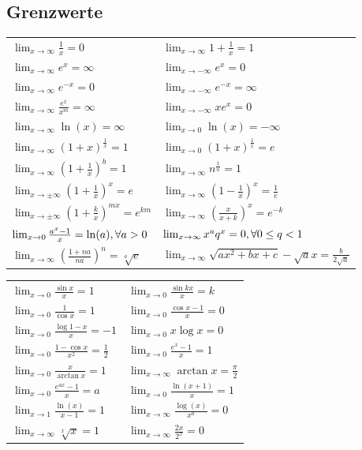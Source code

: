 \documentclass[7pt,landscape, margin = 0.1mm]{article}
\def\limxo{\lim_{x\to 0}}
\def\limxi{\lim_{x\to\infty}}
\def\limxn{\lim_{x\to-\infty}}
\begin{document}
\begin{multicols}{4}
\begin{flushleft}
\subsection{Grenzwerte}
\begin{center}
  \begin{tabularx}{\linewidth}{XX}
    \toprule
    $\limxi \frac{1}{x} = 0$ & $\limxi 1 + \frac{1}{x} = 1$ \\
    $\limxi e^x = \infty$ & $\limxn e^x = 0$ \\
    $\limxi e^{-x} = 0$ & $\limxn e^{-x} = \infty$ \\
    $\limxi \frac{e^x}{x^m} = \infty$ & $\limxn xe^x = 0$ \\
    $\limxi \ln(x) = \infty$ & $\limxo \ln(x) = -\infty$ \\
    $\limxi (1+x)^{\frac{1}{x}} = 1$ & $\limxo (1+x)^{\frac{1}{x}} = e$ \\
    $\limxi (1+\frac{1}{x})^b = 1$ & $\limxi n^{\frac{1}{n}} = 1$ \\
    $\lim_{x\to\pm\infty} (1 + \frac{1}{x})^x = e$ & $\limxi (1-\frac{1}{x})^x = \frac{1}{e}$ \\
    $\lim_{x\to\pm\infty} (1 + \frac{k}{x})^{mx} = e^{km}$ & $\limxi (\frac{x}{x+k})^x = e^{-k}$ \\
    $\limxo \frac{a^x -1}{x} = \ln(a), \newline \forall a > 0$ &
    $\limxi x^a q^x = 0, \newline \forall 0 \le q < 1$ \\
    $\lim_{x \to \infty} \left(\frac{1+ na}{na} \right)^n = \sqrt[a]{e}$ & $\lim_{x \to \infty} \sqrt{ax^2 + bx+c}- \sqrt{a}x = \frac{b}{2 \sqrt{a}}$\\
  \end{tabularx}
  \begin{tabularx}{\linewidth}{XX}
    $\limxo \frac{\sin x}{x} = 1$ & $\limxo \frac{\sin kx}{x} = k$\\
    $\limxo \frac{1}{\cos x} = 1$ & $\limxo \frac{\cos x -1}{x} = 0$ \\
    $\limxo \frac{\log 1 - x}{x} = -1$ & $\limxo x \log x = 0$\\
    $\limxo \frac{1 - \cos x}{x^2} = \frac{1}{2}$ & $\limxo \frac{e^x-1}{x} = 1$ \\
    $\limxo \frac{x}{\arctan x} = 1$ & $\limxi \arctan x = \frac{\pi}{2}$ \\
    $\limxo \frac{e^{ax}-1}{x} = a$ & $\limxo \frac{\ln(x+1)}{x} = 1$ \\
    $\lim_{x\to 1} \frac{\ln(x)}{x-1} = 1$ & $\limxi \frac{\log(x)}{x^a} = 0$ \\
    $\limxi \sqrt[x]{x} = 1$ & $\limxi \frac{2x}{2^x} = 0$ \\
    \bottomrule
  \end{tabularx}
\end{center}


\end{flushleft}
\end{multicols}
\end{document}
